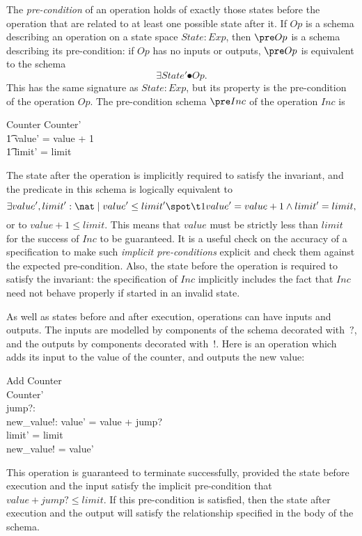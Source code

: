 \new The {\em pre-condition\/}%
of an operation holds of exactly those states before the operation that are
related to at least one possible state after it.  If $Op$ is a
schema describing an operation on a state space $State: Exp $, then $\pre
Op$ is a schema describing its pre-condition: if $Op$ has no inputs
or outputs, $\pre Op$ is equivalent to the schema
\[ \exists State' \spot Op. \]
This has the same signature as $State: Exp $, but its property is the
pre-condition of the operation $Op$.
The pre-condition schema $\pre Inc$ of the operation $Inc$ is
\begin{schema*}
	Counter
\where
	\exists Counter' \spot \\
\t1		value' = value + 1 \land \\
\t1		limit' = limit
\end{schema*}
The state after the operation is implicitly required to
satisfy the invariant, and the predicate in this schema is logically
equivalent to
\[
	\exists value', limit': \nat \mid value' \leq limit' \spot \\
\t1		value' = value + 1 \land limit' = limit,
\]
or to $value + 1 \leq limit$. This means that $value$
must be strictly less than $limit$ for the success of $Inc$ to be
guaranteed.  It is a useful check on the accuracy of a specification
to make such {\em implicit pre-conditions\/}%
explicit and check them against the expected pre-condition.
Also, the state before the operation is required to satisfy the
invariant: the specification of $Inc$ implicitly includes the fact
that $Inc$ need not behave properly if started in an invalid state.

As well as states before and after execution, operations can have
inputs and outputs.  The inputs are modelled by components of the
schema decorated with~$?$, and the outputs by components decorated
with~$!$.  Here is an operation which adds its input to the
value of the counter, and outputs the new value:
\begin{schema}{Add}
	Counter \\
	Counter' \\
	jump?: \nat \\
	new\_value!: \nat
\where
	value' = value + jump? \\
	limit' = limit \\
	new\_value! = value'
\end{schema}
This operation is guaranteed to terminate successfully, provided the
state before execution and the input satisfy the implicit pre-condition that
$value + jump? \leq limit$. If this pre-condition is satisfied, then
the state after execution and the output will satisfy the
relationship specified in the body of the schema.

